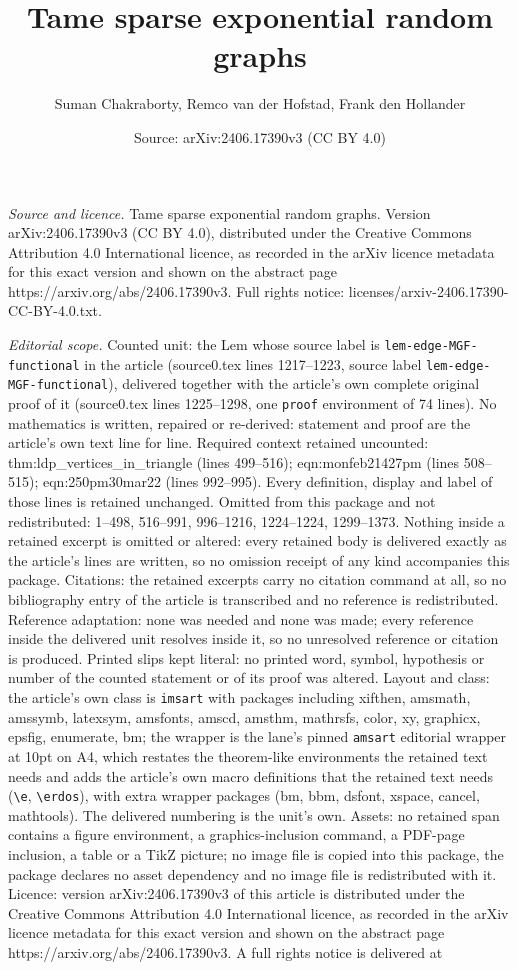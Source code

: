 \documentclass[10pt,a4paper]{amsart}
\title[Tame sparse exponential random graphs]{Tame sparse exponential random graphs}
\author{Suman Chakraborty, Remco van der Hofstad, Frank den Hollander}
\date{Source: arXiv:2406.17390v3 (CC BY 4.0)}
\begin{document}
\maketitle

\noindent\emph{Source and licence.} Tame sparse exponential random graphs. Version arXiv:2406.17390v3 (CC BY 4.0), distributed under the Creative Commons Attribution 4.0 International licence, as recorded in the arXiv licence metadata for this exact version and shown on the abstract page https://arxiv.org/abs/2406.17390v3. Full rights notice: licenses/arxiv-2406.17390-CC-BY-4.0.txt.\par\smallskip

\noindent\textit{Editorial scope.} Counted unit: the Lem whose source label is \texttt{lem-edge-MGF-functional} in the article (source0.tex lines 1217--1223, source label \texttt{lem-edge-MGF-functional}), delivered together with the article's own complete original proof of it (source0.tex lines 1225--1298, one \texttt{proof} environment of 74 lines). No mathematics is written, repaired or re-derived: statement and proof are the article's own text line for line. Required context retained uncounted: thm:ldp\_vertices\_in\_triangle (lines 499--516); eqn:monfeb21427pm (lines 508--515); eqn:250pm30mar22 (lines 992--995). Every definition, display and label of those lines is retained unchanged. Omitted from this package and not redistributed: 1--498, 516--991, 996--1216, 1224--1224, 1299--1373. Nothing inside a retained excerpt is omitted or altered: every retained body is delivered exactly as the article's lines are written, so no omission receipt of any kind accompanies this package. Citations: the retained excerpts carry no citation command at all, so no bibliography entry of the article is transcribed and no reference is redistributed. Reference adaptation: none was needed and none was made; every reference inside the delivered unit resolves inside it, so no unresolved reference or citation is produced. Printed slips kept literal: no printed word, symbol, hypothesis or number of the counted statement or of its proof was altered. Layout and class: the article's own class is \texttt{imsart} with packages including xifthen, amsmath, amssymb, latexsym, amsfonts, amscd, amsthm, mathrsfs, color, xy, graphicx, epsfig, enumerate, bm; the wrapper is the lane's pinned \texttt{amsart} editorial wrapper at 10pt on A4, which restates the theorem-like environments the retained text needs and adds the article's own macro definitions that the retained text needs (\texttt{\textbackslash e}, \texttt{\textbackslash erdos}), with extra wrapper packages (bm, bbm, dsfont, xspace, cancel, mathtools). The delivered numbering is the unit's own. Assets: no retained span contains a figure environment, a graphics-inclusion command, a PDF-page inclusion, a table or a TikZ picture; no image file is copied into this package, the package declares no asset dependency and no image file is redistributed with it. Licence: version arXiv:2406.17390v3 of this article is distributed under the Creative Commons Attribution 4.0 International licence, as recorded in the arXiv licence metadata for this exact version and shown on the abstract page https://arxiv.org/abs/2406.17390v3. A full rights notice is delivered at 
\end{document}
